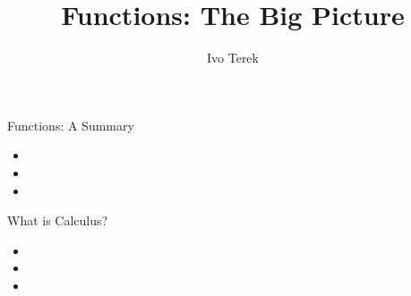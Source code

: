 \documentclass{ximera}
\author{Ivo Terek}
\title{Functions: The Big Picture}
\begin{document}
\begin{abstract}
\end{abstract}
\maketitle


\begin{objectives}

\item Functions: A Summary
\begin{itemize}
	\item 
        \item 
        \item 
\end{itemize}

\item What is Calculus?

  \begin{itemize}
  \item 
  \item 
  \item 
  \end{itemize}

\end{objectives}
\end{document}
